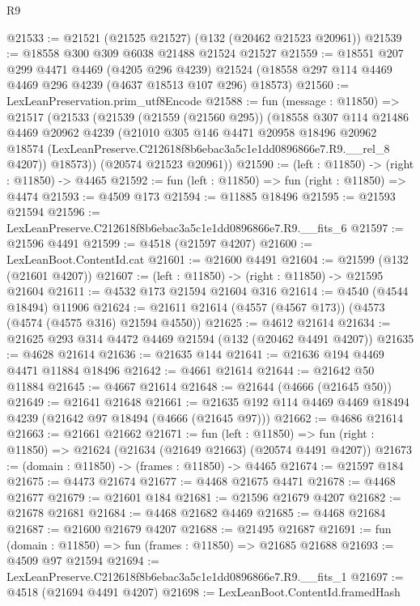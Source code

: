 \begin{lexlean}{R9}
\begin{coremodule}
@21533 := @21521 (@21525 @21527) (@132 (@20462 @21523 @20961))
@21539 := @18558 @300 @309 @6038 @21488 @21524 @21527
@21559 := @18551
    @207
    @299
    @4471
    @4469
    (@4205 @296 @4239)
    @21524
    (@18558 @297 @114 @4469 @4469 @296 @4239 (@4637 @18513 @107 @296) @18573)
@21560 := LexLeanPreservation.prim_utf8Encode
@21588 := fun (message : @11850) =>
  @21517
    (@21533
      (@21539
        (@21559 (@21560 @295))
        (@18558
          @307
          @114
          @21486
          @4469
          @20962
          @4239
          (@21010
            @305
            @146
            @4471
            @20958
            @18496
            @20962
            @18574
            (LexLeanPreserve.C212618f8b6ebac3a5c1e1dd0896866e7.R9.__rel_8 @4207))
          @18573))
      (@20574 @21523 @20961))
@21590 := (left : @11850) -> (right : @11850) -> @4465
@21592 := fun (left : @11850) => fun (right : @11850) => @4474
@21593 := @4509 @173
@21594 := @11885 @18496
@21595 := @21593 @21594
@21596 := LexLeanPreserve.C212618f8b6ebac3a5c1e1dd0896866e7.R9.__fits_6
@21597 := @21596 @4491
@21599 := @4518 (@21597 @4207)
@21600 := LexLeanBoot.ContentId.cat
@21601 := @21600 @4491
@21604 := @21599 (@132 (@21601 @4207))
@21607 := (left : @11850) -> (right : @11850) -> @21595 @21604
@21611 := @4532 @173 @21594 @21604 @316
@21614 := @4540 (@4544 @18494) @11906
@21624 := @21611 @21614 (@4557 (@4567 @173)) (@4573 (@4574 (@4575 @316) @21594 @4550))
@21625 := @4612 @21614
@21634 := @21625 @293 @314 @4472 @4469 @21594 (@132 (@20462 @4491 @4207))
@21635 := @4628 @21614
@21636 := @21635 @144
@21641 := @21636 @194 @4469 @4471 @11884 @18496
@21642 := @4661 @21614
@21644 := @21642 @50 @11884
@21645 := @4667 @21614
@21648 := @21644 (@4666 (@21645 @50))
@21649 := @21641 @21648
@21661 := @21635 @192 @114 @4469 @4469 @18494 @4239 (@21642 @97 @18494 (@4666 (@21645 @97)))
@21662 := @4686 @21614
@21663 := @21661 @21662
@21671 := fun (left : @11850) =>
  fun (right : @11850) => @21624 (@21634 (@21649 @21663) (@20574 @4491 @4207))
@21673 := (domain : @11850) -> (frames : @11850) -> @4465
@21674 := @21597 @184
@21675 := @4473 @21674
@21677 := @4468 @21675 @4471
@21678 := @4468 @21677
@21679 := @21601 @184
@21681 := @21596 @21679 @4207
@21682 := @21678 @21681
@21684 := @4468 @21682 @4469
@21685 := @4468 @21684
@21687 := @21600 @21679 @4207
@21688 := @21495 @21687
@21691 := fun (domain : @11850) => fun (frames : @11850) => @21685 @21688
@21693 := @4509 @97 @21594
@21694 := LexLeanPreserve.C212618f8b6ebac3a5c1e1dd0896866e7.R9.__fits_1
@21697 := @4518 (@21694 @4491 @4207)
@21698 := LexLeanBoot.ContentId.framedHash

\end{coremodule}
\end{lexlean}
